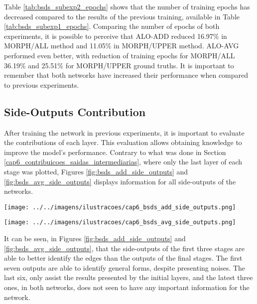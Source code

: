 Table \ref{tab:bsds_subexp2_epochs}  shows that the number of training epochs has decreased compared to the results of the previous training, available in Table \ref{tab:bsds_subexp1_epochs}.
Comparing the number of epochs of both experiments, it is possible to perceive that ALO-ADD reduced 16.97\% in MORPH/ALL method and 11.05\% in MORPH/UPPER method.
ALO-AVG performed even better, with reduction of training epochs for MORPH/ALL 36.19\% and 25.51\% for MORPH/UPPER ground truths.
It is important to remember that both networks have increased their performance when compared to previous experiments.

\subsection{Side-Outputs Contribution}
\label{ssec:bsds_sideout}

After training the network in previous experiments, it is important to evaluate the contributions of each layer.
This evaluation allows obtaining knowledge to improve the model's performance.
Contrary to what was done in Section \ref{cap6_contribuicoes_saidas_intermediarias}, where only the last layer of each stage was plotted, Figures \ref{fig:bsds_add_side_outputs} and \ref{fig:bsds_avg_side_outputs} displays information for all side-outputs of the networks.

\begin{figure*}%
  \centering
  \caption{Side-outputs of each convolution of ALO-ADD method, trained with BSDS 500 using MORPH/UPPER ground truth methods.}
  \texttt{[image: ../../imagens/ilustracoes/cap6\_bsds\_add\_side\_outputs.png]}
  \sourceOwn
  \label{fig:bsds_add_side_outputs}
\end{figure*}

\begin{figure*}%
  \centering
  \caption{Side-outputs of each convolution of ALO-AVG method, trained with BSDS 500 using MORPH/UPPER ground truth methods.}
  \texttt{[image: ../../imagens/ilustracoes/cap6\_bsds\_avg\_side\_outputs.png]}
  \sourceOwn
  \label{fig:bsds_avg_side_outputs}
\end{figure*}

It can be seen, in Figures \ref{fig:bsds_add_side_outputs} and \ref{fig:bsds_avg_side_outputs}, that the side-outputs of the first three stages are able to better identify the edges than the outputs of the final stages.
The first seven outputs are able to identify general forms, despite presenting noises.
The last six, only assist the results presented by the initial layers, and the latest three ones, in both networks, does not seen to have any important information for the network.

